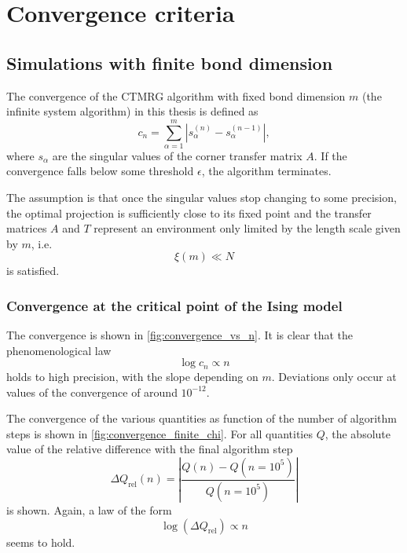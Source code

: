 \section{Convergence criteria}\label{sec:convergence_criteria}

\subsection{Simulations with finite bond dimension}\label{sec:simulations_with_finite_bond_dimension}
The convergence of the CTMRG algorithm with fixed bond dimension $m$ (the infinite system algorithm) in this thesis is
defined as
\begin{equation}\label{eq:convergence}
  c_n = \sum_{\alpha = 1}^{m} | s_{\alpha}^{(n)} - s_{\alpha}^{(n - 1)} |,
\end{equation}
where $s_{\alpha}$ are the singular values of the corner transfer matrix $A$. If the convergence falls below some
threshold $\epsilon$, the algorithm terminates.

The assumption is that once the singular values stop changing to some precision, the optimal projection is sufficiently
close to its fixed point and the transfer matrices $A$ and $T$ represent an environment only limited by the length scale
given by $m$, i.e.
\begin{equation}
  \xi(m) \ll N
\end{equation}
is satisfied.

\subsubsection{Convergence at the critical point of the Ising model}
The convergence is shown in \autoref{fig:convergence_vs_n}. It is clear that the
phenomenological law
\begin{equation}\label{eq:convergence_vs_n_semilogarithmic_law}
  \log c_n \propto n
\end{equation}
holds to high precision, with the slope depending on $m$.
Deviations only occur at values of the convergence of around $10^{-12}$.

The convergence of the various quantities as function of the number of algorithm steps is shown in
\autoref{fig:convergence_finite_chi}. For all quantities $Q$, the absolute value of the relative difference
with the final algorithm step
\begin{equation}\label{eq:abs_rel_diff}
  \Delta Q_{\text{rel}}(n) = \left| \frac{Q(n) - Q(n = 10^5)}{Q(n = 10^5)} \right|
\end{equation}
is shown. Again, a law of the form
\begin{equation}\label{eq:abs_rel_diff_vs_n_semilogarithmic_law}
  \log(\Delta Q_{\text{rel}}) \propto n
\end{equation}
seems to hold.

